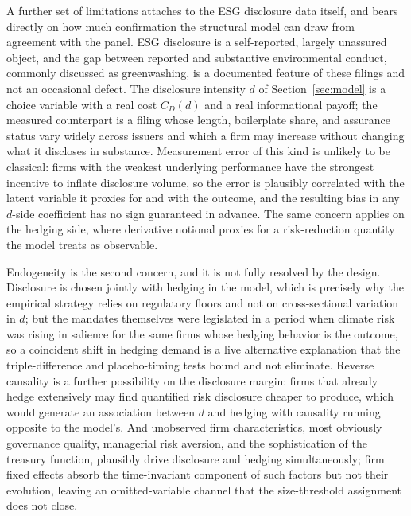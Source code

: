 \documentclass[11pt,a4paper]{article}
\begin{document}
A further set of limitations attaches to the ESG disclosure data itself, and bears directly on how much confirmation the structural model can draw from agreement with the panel. ESG disclosure is a self-reported, largely unassured object, and the gap between reported and substantive environmental conduct, commonly discussed as greenwashing, is a documented feature of these filings and not an occasional defect. The disclosure intensity $d$ of Section~\ref{sec:model} is a choice variable with a real cost $C_D(d)$ and a real informational payoff; the measured counterpart is a filing whose length, boilerplate share, and assurance status vary widely across issuers and which a firm may increase without changing what it discloses in substance. Measurement error of this kind is unlikely to be classical: firms with the weakest underlying performance have the strongest incentive to inflate disclosure volume, so the error is plausibly correlated with the latent variable it proxies for and with the outcome, and the resulting bias in any $d$-side coefficient has no sign guaranteed in advance. The same concern applies on the hedging side, where derivative notional proxies for a risk-reduction quantity the model treats as observable.

Endogeneity is the second concern, and it is not fully resolved by the design. Disclosure is chosen jointly with hedging in the model, which is precisely why the empirical strategy relies on regulatory floors and not on cross-sectional variation in $d$; but the mandates themselves were legislated in a period when climate risk was rising in salience for the same firms whose hedging behavior is the outcome, so a coincident shift in hedging demand is a live alternative explanation that the triple-difference and placebo-timing tests bound and not eliminate. Reverse causality is a further possibility on the disclosure margin: firms that already hedge extensively may find quantified risk disclosure cheaper to produce, which would generate an association between $d$ and hedging with causality running opposite to the model's. And unobserved firm characteristics, most obviously governance quality, managerial risk aversion, and the sophistication of the treasury function, plausibly drive disclosure and hedging simultaneously; firm fixed effects absorb the time-invariant component of such factors but not their evolution, leaving an omitted-variable channel that the size-threshold assignment does not close.
\end{document}
